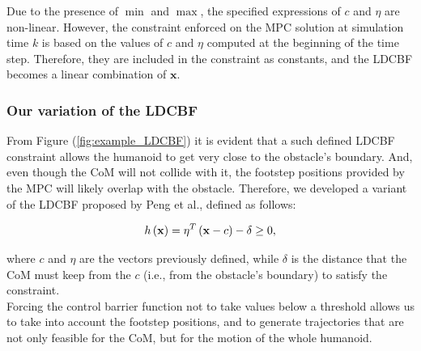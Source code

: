 \documentclass[main.tex]{subfiles}
\begin{document}
Due to the presence of $\min$ and $\max$, the specified expressions of $c$ and $\eta$ are non-linear. However, the constraint enforced on the MPC solution at simulation time $k$ is based on the values of $c$ and $\eta$ computed at the beginning of the time step. Therefore, they are included in the constraint as constants, and the LDCBF becomes a linear combination of $\mathbf{x}$.

\subsubsection{Our variation of the LDCBF}
From Figure (\ref{fig:example_LDCBF}) it is evident that a such defined LDCBF constraint allows the humanoid to get very close to the obstacle's boundary. And, even though the CoM will not collide with it, the footstep positions provided by the MPC will likely overlap with the obstacle. Therefore, we developed a variant of the LDCBF proposed by Peng et al., defined as follows:

\begin{equation} \notag
h\left(\mathbf{x}\right) = \eta^T \left(\mathbf{x} - c\right) - \delta \geq 0,
\end{equation}

where $c$ and $\eta$ are the vectors previously defined, while $\delta$ is the distance that the CoM must keep from the $c$ (i.e., from the obstacle's boundary) to satisfy the constraint.\\
Forcing the control barrier function not to take values below a threshold allows us to take into account the footstep positions, and to generate trajectories that are not only feasible for the CoM, but for the motion of the whole humanoid.
\end{document}
